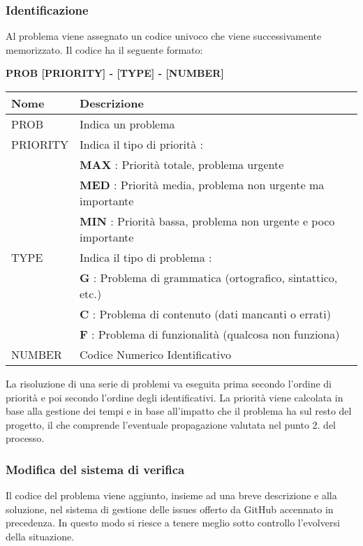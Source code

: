 \subsubsection{Identificazione}
Al problema viene assegnato un codice univoco che viene successivamente memorizzato. \newline 
Il codice ha il seguente formato: \newline
\begin{center}
    \textbf{PROB [PRIORITY] - [TYPE] - [NUMBER]}
\end{center}
\renewcommand{\arraystretch}{1.8} %
    \begin{tabular}{ |m{7em}|m{30em}| }
        \hline
        \textbf{Nome} & \textbf{Descrizione} \\
        \hline
            PROB & Indica un problema \\
        \hline
            PRIORITY 	& 	Indica il tipo di priorità : \\
                        &	\textbf{MAX} : Priorità totale, problema urgente \\
                        &	\textbf{MED} : Priorità media, problema non urgente ma importante \\
                        &	\textbf{MIN} : Priorità bassa, problema non urgente e poco importante \\
        \hline
                    
            TYPE 	& 	Indica il tipo di problema : \\
                    & 	\textbf{G} : Problema di grammatica (ortografico, sintattico, etc.) \\
                    &	\textbf{C} : Problema di contenuto (dati mancanti o errati) \\
                    &	\textbf{F} : Problema di funzionalità (qualcosa non funziona) \\
        \hline
            NUMBER & Codice Numerico Identificativo \\
        \hline
    \end{tabular} \newline \newline
La risoluzione di una serie di problemi va eseguita prima secondo l'ordine di priorità e poi secondo l'ordine degli identificativi. \newline 
La priorità viene calcolata in base alla gestione dei tempi e in base all'impatto che il problema ha sul resto del progetto, il che comprende l'eventuale propagazione valutata nel punto 2. del processo.
\subsubsection{Modifica del sistema di verifica}
Il codice del problema viene aggiunto, insieme ad una breve descrizione e alla soluzione, nel sistema di gestione delle issues offerto da GitHub accennato in precedenza.
In questo modo si riesce a tenere meglio sotto controllo l'evolversi della situazione.